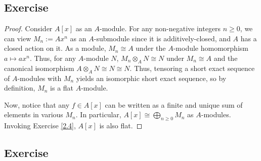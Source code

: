 \subsection{Exercise}\label{2.5} %

\begin{proof}
Consider $A[x]$ as an $A$-module. For any non-negative integers $n \ge 0$, we can view $M_n := Ax^n$ as an $A$-submodule since it is additively-closed, and $A$ has a closed action on it. 
As a module, $M_n \cong A$ under the $A$-module homomorphism $a \mapsto ax^n$. Thus, for any $A$-module $N$, $M_n \otimes_A N \cong N$ under $M_n \cong A$ and the canonical isomorphism 
$A \otimes_A N \cong N \cong N$. Thus, tensoring a short exact sequence of $A$-modules with $M_n$ yields an isomorphic short exact sequence, so by definition, $M_n$ is a flat $A$-module.

Now, notice that any $f \in A[x]$ can be written as a finite and unique sum of elements in various $M_n$. In particular, $A[x] \cong \bigoplus_{n \ge 0} M_n$ as $A$-modules. 
Invoking Exercise \ref{2.4}, $A[x]$ is also flat.
\end{proof}

\subsection{Exercise}\label{2.6} %


